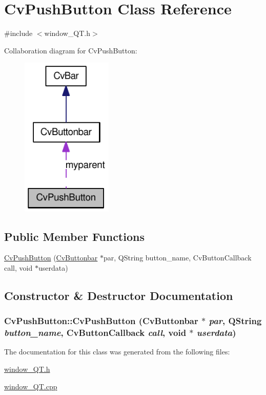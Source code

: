 \hypertarget{classCvPushButton}{
\section{CvPushButton Class Reference}
\label{classCvPushButton}
}


{\ttfamily \#include $<$window\_\-QT.h$>$}



Collaboration diagram for CvPushButton:\nopagebreak
\begin{figure}[H]
\begin{center}
\leavevmode
\includegraphics[width=123pt]{classCvPushButton__coll__graph}
\end{center}
\end{figure}
\subsection*{Public Member Functions}
\begin{DoxyCompactItemize}
\item 
\hyperlink{classCvPushButton_add13c78f22d066ca5dc5a598102890da}{CvPushButton} (\hyperlink{classCvButtonbar}{CvButtonbar} $\ast$par, QString button\_\-name, CvButtonCallback call, void $\ast$userdata)
\end{DoxyCompactItemize}


\subsection{Constructor \& Destructor Documentation}
\hypertarget{classCvPushButton_add13c78f22d066ca5dc5a598102890da}{
\subsubsection[{CvPushButton}]{\setlength{\rightskip}{0pt plus 5cm}CvPushButton::CvPushButton ({\bf CvButtonbar} $\ast$ {\em par}, \/  QString {\em button\_\-name}, \/  CvButtonCallback {\em call}, \/  void $\ast$ {\em userdata})}}
\label{classCvPushButton_add13c78f22d066ca5dc5a598102890da}


The documentation for this class was generated from the following files:\begin{DoxyCompactItemize}
\item 
\hyperlink{window__QT_8h}{window\_\-QT.h}\item 
\hyperlink{window__QT_8cpp}{window\_\-QT.cpp}\end{DoxyCompactItemize}
